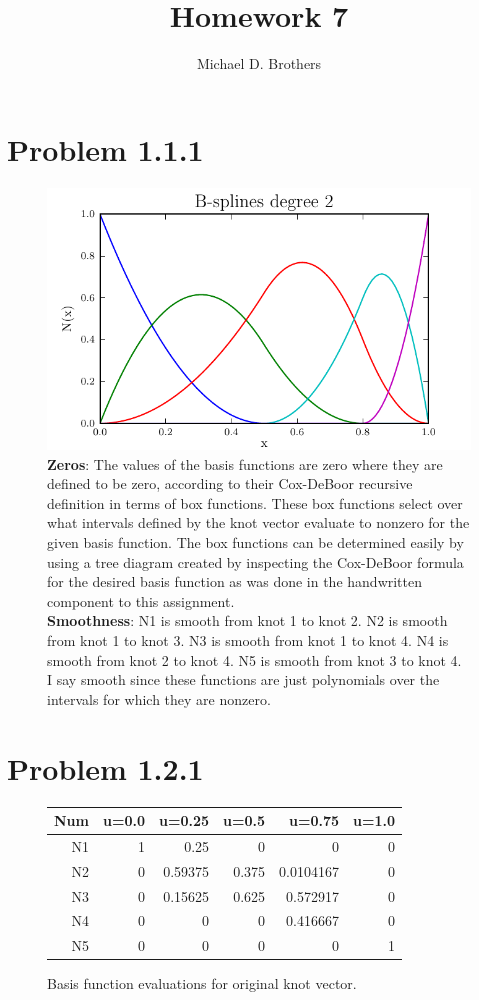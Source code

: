 \documentclass[11pt,letterpaper]{article}
\author{Michael D. Brothers}
\title{Homework 7}
\begin{document}
\section{Problem 1.1.1}

\begin{figure}[!tbh]
    \includegraphics[width=\textwidth]{problem_1_1_1.pdf}
    \caption{\textbf{Zeros}: 
    The values of the basis functions are zero where they are defined to be zero, according to their Cox-DeBoor recursive definition in terms of box functions. 
    These box functions select over what intervals defined by the knot vector evaluate to nonzero for the given basis function. 
    The box functions can be determined easily by using a tree diagram created by inspecting the Cox-DeBoor formula for the desired basis function as was done in the handwritten component to this assignment.\\
    \textbf{Smoothness}:
    N1 is smooth from knot 1 to knot 2. N2 is smooth from knot 1 to knot 3. N3 is smooth from knot 1 to knot 4. N4 is smooth from knot 2 to knot 4. N5 is smooth from knot 3 to knot 4. 
    I say smooth since these functions are just polynomials over the intervals for which they are nonzero.}
    \label{fig1:label:a}

\end{figure}

\section{Problem 1.2.1}

\begin{figure}[!tbh]
\centering
 \begin{tabular}{rrrrrr}
\hline
  Num & u=0.0 &   u=0.25 &   u=0.5 &    u=0.75 &   u=1.0 \\
\hline
  N1 &     1 &  0.25    &   0     & 0         &       0 \\
  N2 &     0 &  0.59375 &   0.375 & 0.0104167 &       0 \\
  N3 &     0 &  0.15625 &   0.625 & 0.572917  &       0 \\
  N4 &      0 &  0       &   0     & 0.416667  &       0 \\
  N5 &     0 &  0       &   0     & 0         &       1 \\
\hline
\end{tabular}
\caption{Basis function evaluations for original knot vector.}
\label{tab1}
\end{figure}
\end{document}
